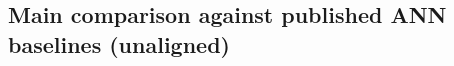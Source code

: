\documentclass{article}
\begin{document}
\subsection{Main comparison against published ANN baselines (unaligned)}
\label{ssec:main}
\end{document}
